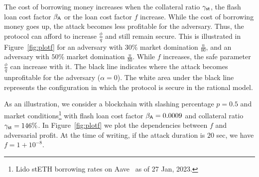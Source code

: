 The cost of borrowing money increases when the collateral ratio
$\gamma_{\textsf{st}}$, the flash loan cost factor $\beta_{\textsf{A}}$ or the loan cost factor $f$
increase. While the cost of borrowing money goes up, the attack becomes less profitable
for the adversary. Thus, the protocol can afford to increase $\frac{\phi}{q}$
and still remain secure. This is illustrated in
Figure~\ref{fig:plotf} for an adversary with $30\%$ market domination $\frac{u}{b0}$,
and an adversary with $50\%$ market domination $\frac{u}{b0}$.
While $f$ increases, the safe parameter $\frac{\phi}{q}$ can increase with it.
The black line indicates where the attack becomes unprofitable for the adversary ($\alpha = 0$).
The white area under the black line represents the configuration in which
the protocol is secure in the rational model.

As an illustration,
we consider a blockchain with slashing percentage
$p = 0.5$ and market conditions\footnote{Lido stETH borrowing rates
on Aave~\cite{aave} as of 27 Jan, 2023.}
with \asset flash loan cost factor $\beta_{\textsf{A}} = 0.0009$ and
collateral ratio $\gamma_{\textsf{st}} = 146\%$.
In Figure~\ref{fig:plotf} we plot the dependencies between $f$ and adversarial
profit. At the time of writing, if the attack duration is $20$ sec, we have
$f = 1 + 10^{-8}$.


